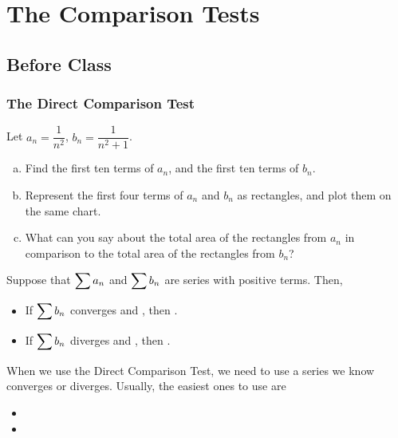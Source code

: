 \documentclass[notes]{subfiles}
\begin{document}
	\fancyhead[LO,RE]{\bfseries \small \currentname}
	\fancyfoot[C]{{}}
	\fancyfoot[RO,LE]{\large \thepage}	%
	
\section*{The Comparison Tests}\label{cs114}
	\subsection*{Before Class}
	\subsubsection*{The Direct Comparison Test}
		\begin{ex} Let $a_n = \dfrac{1}{n^2}$, $b_n = \dfrac{1}{n^2+1}$.
			\begin{enumerate}[(a)]
				\item Find the first ten terms of $a_n$, and the first ten terms of $b_n$.
				\item Represent the first four terms of $a_n$ and $b_n$ as rectangles, and plot them on the same chart.
				\item What can you say about the total area of the rectangles from $a_n$ in comparison to the total area of the rectangles from $b_n$?
			\end{enumerate}
		\end{ex}
			\newpage
			
		\begin{rmk}
			Suppose that $\displaystyle \sum a_n$ and $\displaystyle \sum b_n$ are series with positive terms.  Then,\\
			\begin{itemize}
				\setlength\itemsep{20pt}
				
				\item If $\displaystyle \sum b_n$ converges and , then .
				\item If $\displaystyle \sum b_n$ diverges and , then .
			\end{itemize}
		\end{rmk}
		
		\begin{rmk}
			When we use the Direct Comparison Test, we need to use a series we know converges or diverges.  Usually, the easiest ones to use are\\
			\begin{itemize}
				\setlength\itemsep{15pt}
				\item 
				\item 
			\end{itemize}
		\end{rmk}
		
\end{document}

